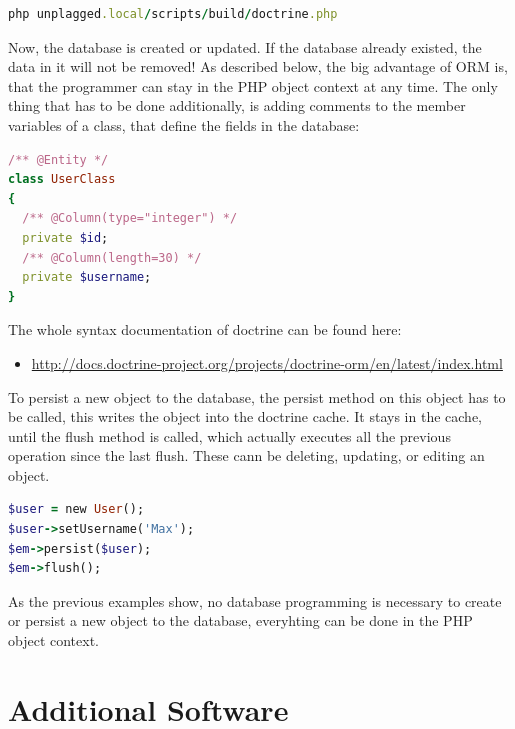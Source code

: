 \begin{lstlisting}[caption=Updating database structure, label=list:updatingDbStructure, language=Ruby]
php unplagged.local/scripts/build/doctrine.php
\end{lstlisting}

Now, the database is created or updated. If the database already existed, the data in it will not be removed! 
As described below, the big advantage of ORM is, that the programmer can stay in the PHP object context at any time. 
The only thing that has to be done additionally, is adding
comments to the member variables of a class, that define the fields in the database:

\begin{lstlisting}[caption=Defining a class in Doctrine, label=list:definingClassDoctrine, language=Ruby]
/** @Entity */
class UserClass
{
  /** @Column(type="integer") */
  private $id;
  /** @Column(length=30) */
  private $username;
}
\end{lstlisting}

The whole syntax documentation of doctrine can be found here: 

\begin{itemize}
\item \url{http://docs.doctrine-project.org/projects/doctrine-orm/en/latest/index.html} 
\end{itemize}

To persist a new object to the database, the persist method on this object has to be called, this writes the object 
into the doctrine cache. It stays in the cache, until the flush method is called, which actually executes all the 
previous operation since the last flush. These cann be deleting, updating, or editing an object.

\begin{lstlisting}[caption=Persisting an object to the database in Doctrine, label=list:persistingObjectDoctrine, language=Ruby]
$user = new User();
$user->setUsername('Max');
$em->persist($user);
$em->flush();
\end{lstlisting}

As the previous examples show, no database programming is necessary to create or persist a new object to the database, 
everyhting can be done in the PHP object context.

\section{Additional Software}

